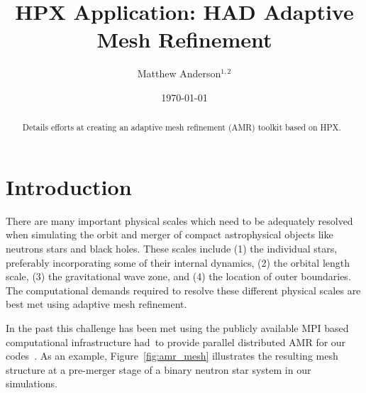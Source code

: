 \documentclass[prd,aps,showpacs,nofootinbib,floats,floatfix,twocolumn,letterpaper]{revtex4}
\newcommand{\had}{{\sc had}}
\begin{document}
\title{HPX Application: HAD Adaptive Mesh Refinement}

\author{Matthew Anderson$^{1,2}$} 



\date{\today}

%
%
\begin{abstract}
Details efforts at creating an adaptive mesh refinement (AMR) toolkit based on HPX.
\end{abstract}

\maketitle

%
%
\section{Introduction}
There are many important physical scales which need to be adequately resolved when
simulating the orbit and merger of compact astrophysical objects like neutrons stars
and black holes.  These scales include (1) the individual stars, preferably incorporating
some of their internal dynamics, (2) the orbital
length scale, (3) the gravitational wave zone, and (4) the
location of outer boundaries.  The computational demands
required to resolve these different physical scales are best met
using adaptive mesh refinement.

In the past this challenge has been met using the publicly available MPI based computational infrastructure
\had\ to provide parallel distributed
AMR for our codes~\cite{had_webpage,Liebling}.  As an example, 
Figure~\ref{fig:amr_mesh} illustrates the resulting mesh structure at a 
pre-merger stage of a binary neutron star system in our simulations.
\end{document}
